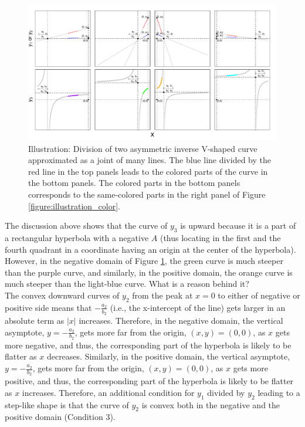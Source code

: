 \documentclass[11pt, a4paper]{article}
\begin{document}
\begin{figure}[H]
	\centering
	\hspace*{-2cm} 
	\includegraphics[width=1.4\columnwidth]{illustration_together.pdf}
	\caption{\small Illustration: Division of two asymmetric inverse V-shaped curve approximated as a joint of many lines. The blue line divided by the red line in the top panels leads to the colored parts of the curve in the bottom panels. The colored parts in the bottom panels corresponds to the same-colored parts in the right panel of Figure \ref{figure:illustration_color}.}
	\label{figure:illustration_hyperbola}
\end{figure}

\noindent
The discussion above shows that the curve of $y_3$ is upward because it is a part of a rectangular hyperbola with a negative $A$ (thus locating in the first and the fourth quadrant in a coordinate having an origin at the center of the hyperbola). However, in the negative domain of Figure \ref{figure:illustration_hyperbola}, the green curve is much steeper than the purple curve, and similarly, in the positive domain, the orange curve is much steeper than the light-blue curve. What is a reason behind it?\\

\noindent
The convex downward curves of $y_2$ from the peak at $x=0$ to either of negative or positive side means that $-\frac{a_2}{b_2}$ (i.e., the x-intercept of the line) gets larger in an absolute term as $|x|$ increases. Therefore, in the negative domain, the vertical asymptote, $y=-\frac{a_2}{b_2}$, gets more far from the origin, $(x, y)=(0, 0)$, as $x$ gets more negative, and thus, the corresponding part of the hyperbola is likely to be flatter as $x$ decreases. Similarly, in the positive domain, the vertical asymptote, $y=-\frac{a_2}{b_2}$, gets more far from the origin, $(x, y)=(0, 0)$, as $x$ gets more positive, and thus, the corresponding part of the hyperbola is likely to be flatter as $x$ increases.   
Therefore, an additional condition for $y_1$ divided by $y_2$ leading to a step-like shape is that the curve of $y_2$ is convex both in the negative and the positive domain (Condition 3).
\end{document}

